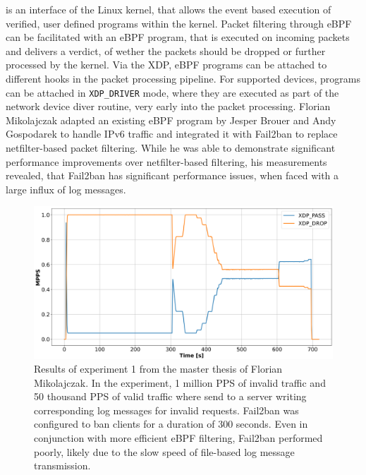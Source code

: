 is an interface of the Linux kernel, that allows the event based execution of verified, user defined programs within the kernel. Packet filtering through \ac{eBPF} can be facilitated with an \ac{eBPF} program,
that is executed on incoming packets and delivers a verdict, of wether the packets should be dropped or further processed by the kernel. Via the \ac{XDP}, \ac{eBPF} programs can be attached to different hooks in 
the packet processing pipeline. For supported devices, programs can be attached in \texttt{XDP\_DRIVER} mode, where they are executed as part of the network device diver routine, very early into the packet processing. Florian Mikolajczak adapted an existing \ac{eBPF} program by Jesper Brouer
and Andy Gospodarek to handle \ac{IPv6} traffic and integrated it with Fail2ban to replace netfilter-based packet filtering. While he was able to demonstrate significant performance improvements over netfilter-based filtering, his measurements 
revealed, that Fail2ban has significant performance issues, when faced with a large influx of log messages. 

\begin{figure}[h!]
	\centering
	\scriptsize
    \centerline{\includegraphics[width=1.2\textwidth]{images/Fail2Ban2.png}}
    \caption[Fail2ban measurement by \cite{mikolajczak2022}]{Results of experiment 1 from the  master thesis of Florian Mikolajczak\cite{mikolajczak2022}. In the experiment, 1 million \ac{PPS} of invalid traffic and 50 thousand \ac{PPS} of valid traffic where send to a server writing corresponding log messages for invalid requests. Fail2ban was 
	configured to ban clients for a duration of 300 seconds. Even in conjunction with more efficient \ac{eBPF} filtering, Fail2ban performed poorly, likely due to the slow speed of file-based log message transmission.}
	\label{fig:fail2ban:mikolajczak2022}
\end{figure}

